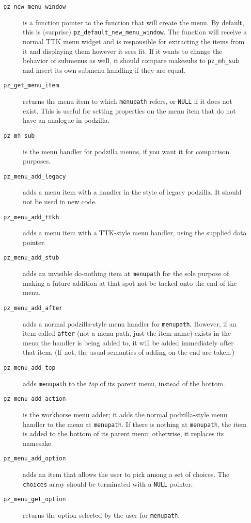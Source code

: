 \documentclass[12pt,letterpaper]{report}
\let\ttt\tt
\def\tt{\def\_{{\ttt\char`\_}}\ttt}
\begin{document}
\begin{description}
\item[{\tt pz_new_menu_window}] is a function pointer to the function that will
create the menu. By default, this is (surprise) \verb|pz_default_new_menu_window|.
The function will receive a normal TTK menu widget and is responsible for extracting
the items from it and displaying them however it sees fit. If it wants to change
the behavior of submenus as well, it should compare {\sf makesub}s to \verb|pz_mh_sub|
and insert its own submenu handling if they are equal.
\item[{\tt pz_get_menu_item}] returns the menu item to which \verb|menupath| refers, or
\verb|NULL| if it does not exist. This is useful for setting properties on the menu item
that do not have an analogue in podzilla.
\item[{\tt pz_mh_sub}] is the menu handler for podzilla menus, if you want it for comparison
purposes.
\item[{\tt pz_menu_add_legacy}] adds a menu item with a handler in the style of legacy podzilla.
It should not be used in new code.
\item[{\tt pz_menu_add_ttkh}] adds a menu item with a TTK-style menu handler, using the supplied
data pointer.
\item[{\tt pz_menu_add_stub}] adds an invisible do-nothing item at \verb|menupath| for the sole
purpose of making a future addition at that spot not be tacked onto the end of the menu.
\item[{\tt pz_menu_add_after}] adds a normal podzilla-style menu handler for \verb|menupath|.
However, if an item called \verb|after| (not a menu path, just the item name) exists in
the menu the handler is being added to, it will be added immediately after that item.
(If not, the usual semantics of adding on the end are taken.)
\item[{\tt pz_menu_add_top}] adds \verb|menupath| to the {\it top} of
its parent menu, instead of the bottom.
\item[{\tt pz_menu_add_action}] is the workhorse menu adder; it adds the normal podzilla-style
menu handler to the menu at \verb|menupath|. If there is nothing at \verb|menupath|, the item is
added to the bottom of its parent menu; otherwise, it replaces its namesake.
\item[{\tt pz_menu_add_option}] adds an item that allows the user to pick among a set of choices.
The \verb|choices| array should be terminated with a \verb|NULL| pointer.
\item[{\tt pz_menu_get_option}] returns the option selected by the user for \verb|menupath|,

\end{description}
\end{document}
